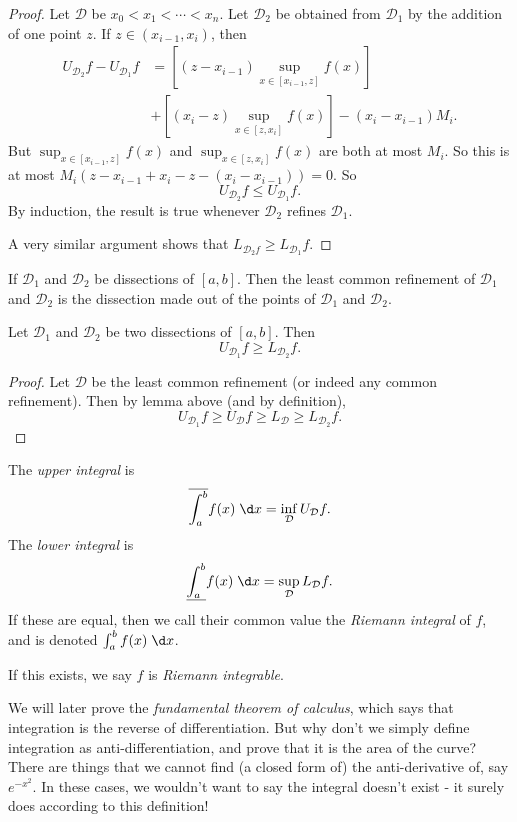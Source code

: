 \documentclass[a4paper]{article}
\begin{document}
\begin{proof}
  Let $\mathcal{D}$ be $x_0 < x_1 < \cdots < x_n$. Let $\mathcal{D}_2$ be obtained from $\mathcal{D}_1$ by the addition of one point $z$. If $z\in (x_{i - 1}, x_i)$, then
  \begin{align*}
    U_{\mathcal{D}_2}f - U_{\mathcal{D}_1}f &= \left[(z - x_{i - 1}) \sup_{x\in [x_{i - 1}, z]} f(x)\right]\\
    &+ \left[(x_i - z)\sup_ {x\in[z, x_i]}f(x)\right] - (x_i - x_{i - 1})M_i.
  \end{align*}
  But $\sup_{x\in [x_{i - 1}, z]} f(x)$ and $\sup_{x\in [z, x_i]} f(x)$ are both at most $M_i$. So this is at most $M_i( z - x_{i - 1} + x_i - z - (x_i - x_{i - 1})) =0 $. So
  \[
    U_{\mathcal{D}_2} f\leq U_{\mathcal{D}_1}f.
  \]
  By induction, the result is true whenever $\mathcal{D}_2$ refines $\mathcal{D}_1$.

  A very similar argument shows that $L_{\mathcal{D}_2f} \geq L_{\mathcal{D}_1}f$.
\end{proof}
\begin{defi}
  If $\mathcal{D}_1$ and $\mathcal{D}_2$ be dissections of $[a, b]$. Then the least common refinement of $\mathcal{D}_1$ and $\mathcal{D}_2$ is the dissection made out of the points of $\mathcal{D}_1$ and $\mathcal{D}_2$.
\end{defi}

\begin{cor}
  Let $\mathcal{D}_1$ and $\mathcal{D}_2$ be two dissections of $[a, b]$. Then
  \[
    U_{\mathcal{D}_1}f \geq L_{\mathcal{D}_2}f.
  \]
\end{cor}
\begin{proof}
  Let $\mathcal{D}$ be the least common refinement (or indeed any common refinement). Then by lemma above (and by definition),
  \[
    U_{\mathcal{D}_1}f \geq U_{\mathcal{D}}f \geq L_{\mathcal{D}} \geq L_{\mathcal{D}_2}f.
  \]
\end{proof}

\begin{defi}
  The \emph{upper integral} is
  \[
    \overline{\int_a^b} f(x)\;\d x = \inf_{\mathcal{D}}U_{\mathcal{D}}f.
  \]
  The \emph{lower integral} is
  \[
    \underline{\int_a^b} f(x)\;\d x = \sup_{\mathcal{D}}L_{\mathcal{D}}f.
  \]
  If these are equal, then we call their common value the \emph{Riemann integral} of $f$, and is denoted $\int_a^b f(x)\;\d x$.

  If this exists, we say $f$ is \emph{Riemann integrable}.
\end{defi}
We will later prove the \emph{fundamental theorem of calculus}, which says that integration is the reverse of differentiation. But why don't we simply define integration as anti-differentiation, and prove that it is the area of the curve? There are things that we cannot find (a closed form of) the anti-derivative of, say $e^{-x^2}$. In these cases, we wouldn't want to say the integral doesn't exist - it surely does according to this definition!
\end{document}
